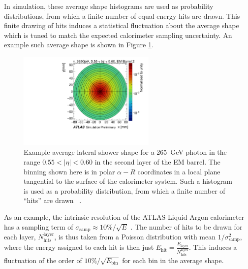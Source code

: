 In simulation, these average shape histograms are used as probability distributions, from which a finite number of equal 
energy hits are drawn. This finite drawing of hits induces a statistical fluctuation about the average shape which is tuned 
to match the expected calorimeter sampling uncertainty. An example such average shape is shown in Figure \ref{fig:photon-ave-shape}.
\begin{figure}[ht!]
\centering
\includegraphics[width=0.6\textwidth]{figures/photon-ave-shape.pdf}
\caption{Example average lateral shower shape for a \SI{265}{\GeV} photon in the range $0.55 < |\eta| < 0.60$ in the second layer of the EM barrel. The binning shown here is in polar $\alpha-R$ coordinates in a local plane 
tangential to the surface of the calorimeter system. Such a histogram is used as a probability distribution, from 
which a finite number of ``hits'' are drawn ~\cite{ATL-SOFT-PUB-2018-002}.}
\label{fig:photon-ave-shape} 
\end{figure}

As an example, the intrinsic resolution of the ATLAS Liquid Argon calorimeter has a sampling term of 
$\sigma_{\text{samp}} \approx 10\%/\sqrt{E}$ \cite{SamplingCalo}. The number of hits to be drawn for each layer, 
$N_{\text{hits}}^{\text{layer}}$, is thus taken from a Poisson distribution with mean $1/\sigma_{\text{samp}}^2$, where the 
energy assigned to each hit is then just $E_{\text{hit}} = \frac{E_{\text{layer}}}{N_{\text{hits}}^{\text{layer}}}$. This 
induces a fluctuation of the order of $10\%/\sqrt{E_{\text{bin}}}$ for each bin in the average shape.

